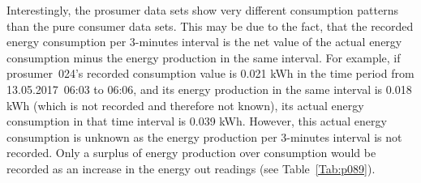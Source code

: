 Interestingly, the prosumer data sets show very different consumption patterns than the pure consumer data sets. This may be due to the fact, that the recorded energy consumption per 3-minutes interval is the net value of the actual energy consumption minus the energy production in the same interval. For example, if prosumer~024's recorded consumption value is 0.021 kWh in the time period from 13.05.2017~06:03 to 06:06, and its energy production in the same interval is 0.018 kWh (which is not recorded and therefore not known), its actual energy consumption in that time interval is 0.039 kWh. However, this actual energy consumption is unknown as the energy production per 3-minutes interval is not recorded. Only a surplus of energy production over consumption would be recorded as an increase in the energy out readings (see Table~\ref{Tab:p089}).

